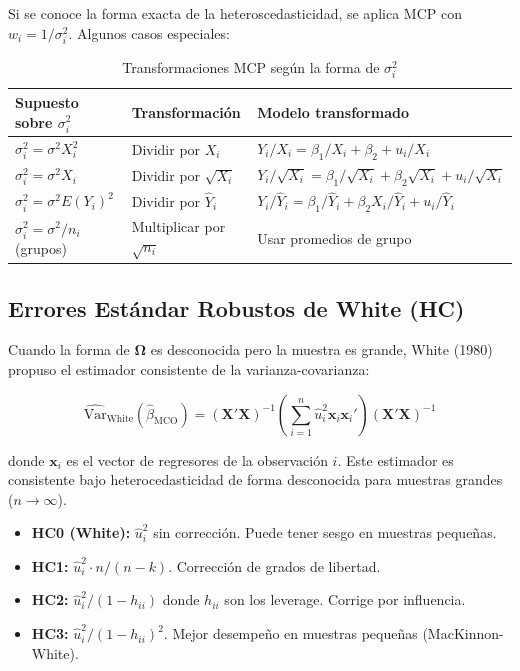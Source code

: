 \documentclass[12pt,a4paper]{report}
\theoremstyle{definition}
\theoremstyle{remark}
\newcommand{\Var}{\mathrm{Var}}
\newcommand{\betahat}{\hat{\beta}}
\newcommand{\uhat}{\hat{u}}
\newcommand{\OLS}{\text{MCO}}
\begin{document}
Si se conoce la forma exacta de la heteroscedasticidad, se aplica MCP con $w_i = 1/\sigma_i^2$. Algunos casos especiales:

\begin{table}[H]
  \centering
  \caption{Transformaciones MCP según la forma de $\sigma_i^2$}
  \label{tab:transformaciones}
  \begin{tabular}{lll}
    \toprule
    \textbf{Supuesto sobre $\sigma_i^2$} & \textbf{Transformación} & \textbf{Modelo transformado} \\
    \midrule
    $\sigma_i^2 = \sigma^2 X_i^2$ & Dividir por $X_i$ & $Y_i/X_i = \beta_1/X_i + \beta_2 + u_i/X_i$ \\
    $\sigma_i^2 = \sigma^2 X_i$ & Dividir por $\sqrt{X_i}$ & $Y_i/\sqrt{X_i} = \beta_1/\sqrt{X_i} + \beta_2\sqrt{X_i} + u_i/\sqrt{X_i}$ \\
    $\sigma_i^2 = \sigma^2 E(Y_i)^2$ & Dividir por $\hat{Y}_i$ & $Y_i/\hat{Y}_i = \beta_1/\hat{Y}_i + \beta_2 X_i/\hat{Y}_i + u_i/\hat{Y}_i$ \\
    $\sigma_i^2 = \sigma^2 / n_i$ (grupos) & Multiplicar por $\sqrt{n_i}$ & Usar promedios de grupo \\
    \bottomrule
  \end{tabular}
\end{table}

\subsection{Errores Estándar Robustos de White (HC)}

Cuando la forma de $\boldsymbol{\Omega}$ es desconocida pero la muestra es grande, White (1980) propuso el estimador consistente de la varianza-covarianza:

\begin{equation}
  \widehat{\Var}_{\text{White}}(\betahat_{\OLS}) = (\mathbf{X}'\mathbf{X})^{-1} \left(\sum_{i=1}^n \uhat_i^2 \mathbf{x}_i \mathbf{x}_i'\right) (\mathbf{X}'\mathbf{X})^{-1}
  \label{eq:white_sandwich}
\end{equation}

donde $\mathbf{x}_i$ es el vector de regresores de la observación $i$. Este estimador es consistente bajo heterocedasticidad de forma desconocida para muestras grandes ($n \to \infty$).

\begin{tcolorbox}[notastyle, title={Variantes del Estimador Robusto (HC0 a HC3)}]
  \begin{itemize}
    \item \textbf{HC0 (White):} $\uhat_i^2$ sin corrección. Puede tener sesgo en muestras pequeñas.
    \item \textbf{HC1:} $\uhat_i^2 \cdot n/(n-k)$. Corrección de grados de libertad.
    \item \textbf{HC2:} $\uhat_i^2/(1-h_{ii})$ donde $h_{ii}$ son los leverage. Corrige por influencia.
    \item \textbf{HC3:} $\uhat_i^2/(1-h_{ii})^2$. Mejor desempeño en muestras pequeñas (MacKinnon-White).
  \end{itemize}
\end{tcolorbox}
\end{document}
